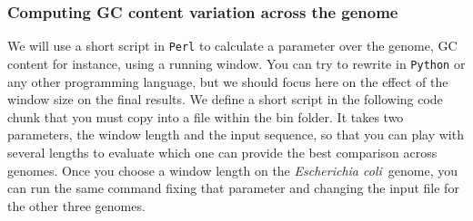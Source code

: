 \documentclass[10pt,a4paper,]{article}
\begin{document}

\clearpage
\newpage

\hypertarget{computing-gc-content-variation-across-the-genome}{%
\subsubsection{Computing GC content variation across the
genome}\label{computing-gc-content-variation-across-the-genome}}

We will use a short script in \texttt{Perl} to calculate a parameter
over the genome, GC content for instance, using a running window. You
can try to rewrite in \texttt{Python} or any other programming language,
but we should focus here on the effect of the window size on the final
results. We define a short script in the following code chunk that you
must copy into a file within the bin folder. It takes two parameters,
the window length and the input sequence, so that you can play with
several lengths to evaluate which one can provide the best comparison
across genomes. Once you choose a window length on the
\textit{Escherichia coli}~genome, you can run the same command fixing
that parameter and changing the input file for the other three genomes.
\end{document}
